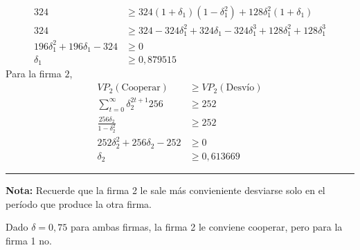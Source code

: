 \begin{itemize}
\begin{solution}
\begin{align*}
            324 & \geq 324(1+\delta_{1})(1-\delta_{1}^{2})+128 \delta_{1}^{2}(1+\delta_{1}) \\
            324 & \geq 324-324 \delta_{1}^{2}+324 \delta_{1}-324 \delta_{1}^{3}+128 \delta_{1}^{2}+128 \delta_{1}^{3} \\
            196 \delta_{1}^{2}+196 \delta_{1}-324 & \geq 0 \\
            \delta_{1} & \geq 0,879515
        \end{align*} 
        Para la firma $2$, 
        \begin{align*}
            V P_{2}(\text {Cooperar}) & \geq V P_{2}(\text {Desvío}) \\ 
            \sum_{t=0}^{\infty} \delta_{2}^{2 t+1} 256 & \geq 252 \\
            \frac{256 \delta_{2}}{1-\delta_{2}^{2}} & \geq 252 \\ 
            252 \delta_{2}^{2}+256 \delta_{2}-252 & \geq 0 \\
            \delta_{2} & \geq 0,613669
        \end{align*}
        \rule{\linewidth}{0.4pt} 
        \textbf{Nota:} Recuerde que la firma 2 le sale más convieniente desviarse solo en el período que produce la otra firma.

        Dado $\delta=0,75$ para ambas firmas, la firma 2 le conviene cooperar, pero para la firma 1 no.
    \end{solution}
\end{itemize}